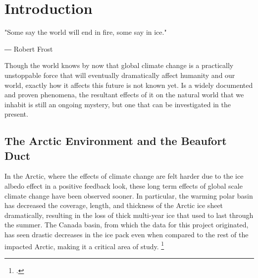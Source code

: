 
\chapter{Introduction}  \label{introduction}

\begin{center}
  \begin{minipage}{0.5\textwidth}
    \begin{small}
      "Some say the world will end in fire, some say in ice." 
      
      ― Robert Frost
    \end{small}
  \end{minipage}
  \vspace{0.5cm}
\end{center}

\noindent Though the world knows by now that global climate change is a practically unstoppable force that will eventually dramatically affect humanity and our world, exactly how it affects this future is not known yet. Is a widely documented and proven phenomena, the resultant effects of it on the natural world that we inhabit is still an ongoing mystery, but one that can be investigated in the present. %

\section{The Arctic Environment and the Beaufort Duct} \label{intro_enviro}

In the Arctic, where the effects of climate change are felt harder due to the ice albedo effect in a positive feedback look, these long term effects of global scale climate change have been observed sooner. In particular, the warming polar basin has decreased the coverage, length, and thickness of the Arctic ice sheet dramatically, resulting in the loss of thick multi-year ice that used to last through the summer. The Canada basin, from which the data for this project originated, has seen drastic decreases in the ice pack even when compared to the rest of the impacted Arctic, making it a critical area of study. \footcite[]{mclaughlin2011rapid}

